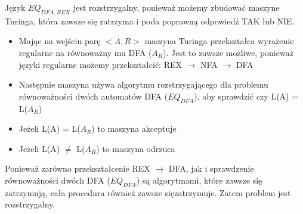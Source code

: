 \documentclass{article}
\begin{document}
Język $EQ_{DFA,REX}$ jest rozstrzygalny, ponieważ możemy zbudować maszyne Turinga, która zawsze się zatrzyma i poda poprawną odpowiedź TAK lub NIE.
\begin{itemize}
    \item Mając na wejściu parę $<A,R>$ maszyna Turinga przekształca wyrażenie regularne na równoważny mu DFA ($A_R$). Jest to zawsze możliwe, ponieważ języki regularne możemy przekształcić: REX $\rightarrow$ NFA $\rightarrow$ DFA
    \item Następnie maszyna używa algorytmu rozstrzygającego dla problemu równoważności dwóch automatów DFA ($EQ_{DFA}$), aby sprawdzić czy L(A) = L($A_R$)
    \item Jeżeli L(A) = L($A_R$) to maszyna akceptuje
    \item Jeżeli L(A) $\neq$ L($A_R$) to maszyna odrzuca
\end{itemize}

Ponieważ zarówno przekształcenie REX $\rightarrow$ DFA, jak i sprawdzenie równoważności dwóch DFA ($EQ_{DFA}$) są algorytmami, które zawsze się zatrzymują, cała procedura również zawsze sięzatrzymuje. Zatem problem jest rozstrzygalny.
\end{document}
